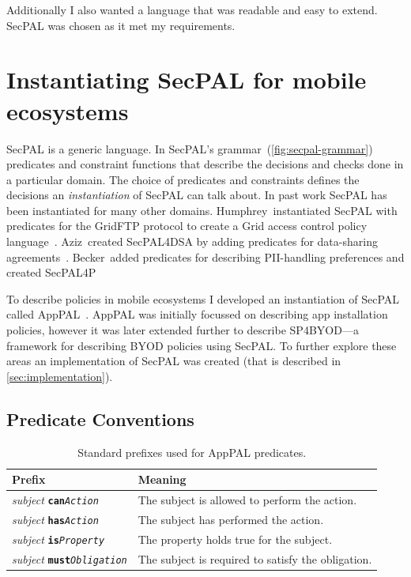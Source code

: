 \documentclass[thesis.tex]{subfiles}
\begin{document}
Additionally I also wanted a language that was readable and easy to extend.
SecPAL was chosen as it met my requirements.

\section{Instantiating SecPAL for mobile ecosystems}
\label{sec:instantiating}

SecPAL is a generic language.
In SecPAL's grammar~(\autoref{fig:secpal-grammar}) predicates and constraint functions that describe the decisions and checks done in a particular domain.
The choice of predicates and constraints defines the decisions an \emph{instantiation} of SecPAL can talk about.
In past work SecPAL has been instantiated for many other domains.
Humphrey~\etal instantiated SecPAL with predicates for the GridFTP protocol to create a Grid access control policy language~\cite{humphrey_fine-grained_2007}.
Aziz~\etal created SecPAL4DSA by adding predicates for data-sharing agreements~\cite{aziz_secpal4dsa:_2011}.
Becker~\etal added predicates for describing \ac{PII}-handling preferences and created SecPAL4P~\cite{becker_framework_2009}

To describe policies in mobile ecosystems I developed an instantiation of SecPAL called AppPAL~\cite{hallett_apppal_2016}.
AppPAL was initially focussed on describing app installation policies, however it was later extended further to describe SP4BYOD---a framework for describing BYOD policies using SecPAL.
To further explore these areas an implementation of SecPAL was created (that is described in \autoref{sec:implementation}).

\subsection{Predicate Conventions}
\label{ssec:types}

\newcommand{\descPred}[2]{\emph{subject} \texttt{\textbf{#1}\emph{#2}}}
\begin{table}
  \begin{tabular}{l l}
    \toprule
    Prefix                      & Meaning                                            \\
    \midrule
    \descPred{can}{Action}      & The subject is allowed to perform the action.      \\
    \descPred{has}{Action}      & The subject has performed the action.              \\
    \descPred{is}{Property}     & The property holds true for the subject.           \\
    \descPred{must}{Obligation} & The subject is required to satisfy the obligation. \\
    \bottomrule
  \end{tabular}
  \caption{Standard prefixes used for AppPAL predicates.}
  \label{tab:predicate-prefixes}
\end{table}
\end{document}
